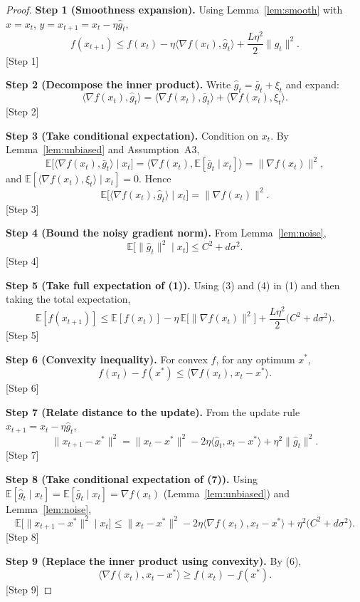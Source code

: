 \documentclass{article}
\newcommand{\EE}{\mathbb{E}}
\begin{document}
\begin{proof}
\textbf{Step 1 (Smoothness expansion).}  
Using Lemma~\ref{lem:smooth} with $x=x_t$, $y=x_{t+1}=x_t-\eta\hat g_t$,
\[
f(x_{t+1})\le f(x_t)-\eta\langle\nabla f(x_t),\hat g_t\rangle
+\frac{L\eta^{2}}{2}\|\hat g_t\|^{2}. \tag{1}
\] 
[Step 1]

\textbf{Step 2 (Decompose the inner product).}  
Write $\hat g_t=\bar g_t+\xi_t$ and expand:
\[
\langle\nabla f(x_t),\hat g_t\rangle
= \langle\nabla f(x_t),\bar g_t\rangle
  +\langle\nabla f(x_t),\xi_t\rangle. \tag{2}
\] 
[Step 2]

\textbf{Step 3 (Take conditional expectation).}  
Condition on $x_t$. By Lemma~\ref{lem:unbiased} and Assumption~A3,
\[
\EE\!\bigl[\langle\nabla f(x_t),\bar g_t\rangle\mid x_t\bigr]
= \langle\nabla f(x_t),\EE[\bar g_t\mid x_t]\rangle
= \|\nabla f(x_t)\|^{2},
\]
and $\EE[\langle\nabla f(x_t),\xi_t\rangle\mid x_t]=0$.
Hence
\[
\EE\!\bigl[\langle\nabla f(x_t),\hat g_t\rangle\mid x_t\bigr]
= \|\nabla f(x_t)\|^{2}. \tag{3}
\] 
[Step 3]

\textbf{Step 4 (Bound the noisy gradient norm).}  
From Lemma~\ref{lem:noise},
\[
\EE\!\bigl[\|\hat g_t\|^{2}\mid x_t\bigr]\le C^{2}+d\sigma^{2}. \tag{4}
\] 
[Step 4]

\textbf{Step 5 (Take full expectation of (1)).}  
Using (3) and (4) in (1) and then taking the total expectation,
\[
\EE[f(x_{t+1})]\le
\EE[f(x_t)]-\eta\,\EE\!\bigl[\|\nabla f(x_t)\|^{2}\bigr]
+\frac{L\eta^{2}}{2}\bigl(C^{2}+d\sigma^{2}\bigr). \tag{5}
\] 
[Step 5]

\textbf{Step 6 (Convexity inequality).}  
For convex $f$, for any optimum $x^{*}$,
\[
f(x_t)-f(x^{*})\le\langle\nabla f(x_t),x_t-x^{*}\rangle. \tag{6}
\] 
[Step 6]

\textbf{Step 7 (Relate distance to the update).}  
From the update rule $x_{t+1}=x_t-\eta\hat g_t$,
\[
\|x_{t+1}-x^{*}\|^{2}
= \|x_t-x^{*}\|^{2}
-2\eta\langle\hat g_t,x_t-x^{*}\rangle
+\eta^{2}\|\hat g_t\|^{2}. \tag{7}
\] 
[Step 7]

\textbf{Step 8 (Take conditional expectation of (7)).}  
Using $\EE[\hat g_t\mid x_t]=\EE[\bar g_t\mid x_t]=\nabla f(x_t)$ (Lemma~\ref{lem:unbiased})
and Lemma~\ref{lem:noise},
\[
\EE\!\bigl[\|x_{t+1}-x^{*}\|^{2}\mid x_t\bigr]
\le \|x_t-x^{*}\|^{2}
-2\eta\langle\nabla f(x_t),x_t-x^{*}\rangle
+\eta^{2}\bigl(C^{2}+d\sigma^{2}\bigr). \tag{8}
\] 
[Step 8]

\textbf{Step 9 (Replace the inner product using convexity).}  
By (6),
\[
\langle\nabla f(x_t),x_t-x^{*}\rangle \ge f(x_t)-f(x^{*}). \tag{9}
\] 
[Step 9]


\end{proof}
\end{document}
